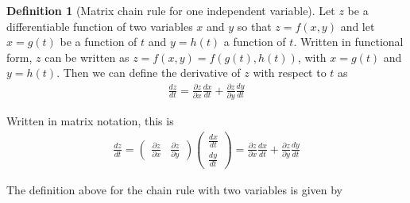 \documentclass[
]{book}
\theoremstyle{definition}
\newtheorem{definition}{Definition}[chapter]
\theoremstyle{definition}
\theoremstyle{definition}
\theoremstyle{definition}
\theoremstyle{remark}
\begin{document}
\begin{definition}[Matrix chain rule for one independent variable]
Let \(z\) be a differentiable function of two variables \(x\) and \(y\) so that \(z = f(x, y)\) and let \(x=g(t)\) be a function of \(t\) and \(y=h(t)\) a function of \(t\). Written in functional form, \(z\) can be written as \(z = f(x, y) = f(g(t), h(t))\), with \(x=g(t)\) and \(y=h(t)\). Then we can define the derivative of \(z\) with respect to \(t\) as
\[
\begin{aligned}
\frac{dz}{dt} = \frac{\partial z}{ \partial x}\frac{dx}{dt} + \frac{\partial z}{\partial y}\frac{dy}{dt}
\end{aligned}
\]

Written in matrix notation, this is
\[
\begin{aligned}
\frac{dz}{dt} = \begin{pmatrix} \frac{\partial z}{ \partial x} & \frac{\partial z}{\partial y} \end{pmatrix} \begin{pmatrix} \frac{dx}{dt} \\  \frac{dy}{dt} \end{pmatrix} = \frac{\partial z}{ \partial x}\frac{dx}{dt} + \frac{\partial z}{\partial y}\frac{dy}{dt}
\end{aligned}
\]
\end{definition}

The definition above for the chain rule with two variables is given by
\end{document}
